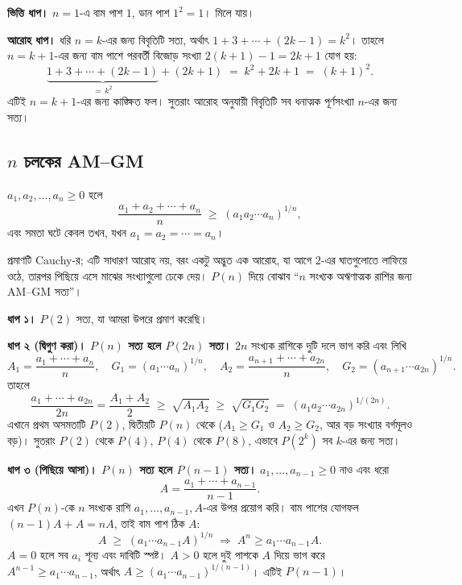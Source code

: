 \documentclass[11pt]{article}
\begin{document}
\begin{solbox}
\textbf{ভিত্তি ধাপ।} $n = 1$-এ বাম পাশ $1$, ডান পাশ $1^2 = 1$। মিলে যায়।

\textbf{আরোহ ধাপ।} ধরি $n = k$-এর জন্য বিবৃতিটি সত্য, অর্থাৎ
$1 + 3 + \cdots + (2k-1) = k^2$। তাহলে $n = k+1$-এর জন্য বাম পাশে পরবর্তী বিজোড়
সংখ্যা $2(k+1) - 1 = 2k+1$ যোগ হয়:
\[
  \underbrace{1 + 3 + \cdots + (2k-1)}_{= \, k^2} + (2k+1)
  \;=\; k^2 + 2k + 1 \;=\; (k+1)^2 .
\]
এটিই $n = k+1$-এর জন্য কাঙ্ক্ষিত ফল। সুতরাং আরোহ অনুযায়ী বিবৃতিটি সব ধনাত্মক
পূর্ণসংখ্যা $n$-এর জন্য সত্য।
\end{solbox}

\subsection{\texorpdfstring{$n$}{n} চলকের AM--GM}

\begin{idea}[AM--GM, সাধারণ রূপ]
$a_1, a_2, \dots, a_n \geq 0$ হলে
\[
  \frac{a_1 + a_2 + \cdots + a_n}{n}
  \;\geq\; \left( a_1 a_2 \cdots a_n \right)^{1/n} ,
\]
এবং সমতা ঘটে কেবল তখন, যখন $a_1 = a_2 = \cdots = a_n$।
\end{idea}

প্রমাণটি Cauchy-র; এটি সাধারণ আরোহ নয়, বরং একটু অদ্ভুত এক আরোহ, যা আগে $2$-এর
ঘাতগুলোতে লাফিয়ে ওঠে, তারপর পিছিয়ে এসে মাঝের সংখ্যাগুলো ঢেকে দেয়। $P(n)$
দিয়ে বোঝাব ``$n$ সংখ্যক অঋণাত্মক রাশির জন্য AM--GM সত্য''।

\textbf{ধাপ ১।} $P(2)$ সত্য, যা আমরা উপরে প্রমাণ করেছি।

\textbf{ধাপ ২ (দ্বিগুণ করা)। $P(n)$ সত্য হলে $P(2n)$ সত্য।} $2n$ সংখ্যক রাশিকে
দুটি দলে ভাগ করি এবং লিখি
\[
  A_1 = \frac{a_1 + \cdots + a_n}{n}, \quad
  G_1 = (a_1 \cdots a_n)^{1/n}, \quad
  A_2 = \frac{a_{n+1} + \cdots + a_{2n}}{n}, \quad
  G_2 = (a_{n+1} \cdots a_{2n})^{1/n} .
\]
তাহলে
\[
  \frac{a_1 + \cdots + a_{2n}}{2n} = \frac{A_1 + A_2}{2}
  \;\geq\; \sqrt{A_1 A_2}
  \;\geq\; \sqrt{G_1 G_2}
  \;=\; \left( a_1 a_2 \cdots a_{2n} \right)^{1/(2n)} .
\]
এখানে প্রথম অসমতাটি $P(2)$, দ্বিতীয়টি $P(n)$ থেকে ($A_1 \geq G_1$ ও
$A_2 \geq G_2$, আর বড় সংখ্যার বর্গমূলও বড়)। সুতরাং $P(2)$ থেকে $P(4)$, $P(4)$
থেকে $P(8)$, এভাবে $P(2^k)$ সব $k$-এর জন্য সত্য।

\textbf{ধাপ ৩ (পিছিয়ে আসা)। $P(n)$ সত্য হলে $P(n-1)$ সত্য।} $a_1, \dots,
a_{n-1} \geq 0$ নাও এবং ধরো
\[
  A = \frac{a_1 + \cdots + a_{n-1}}{n-1} .
\]
এখন $P(n)$-কে $n$ সংখ্যক রাশি $a_1, \dots, a_{n-1}, A$-এর উপর প্রয়োগ করি। বাম
পাশের যোগফল $(n-1)A + A = nA$, তাই বাম পাশ ঠিক $A$:
\[
  A \;\geq\; \left( a_1 \cdots a_{n-1} A \right)^{1/n}
  \;\Longrightarrow\; A^{n} \geq a_1 \cdots a_{n-1} A .
\]
$A = 0$ হলে সব $a_i$ শূন্য এবং দাবিটি স্পষ্ট। $A > 0$ হলে দুই পাশকে $A$ দিয়ে
ভাগ করে $A^{n-1} \geq a_1 \cdots a_{n-1}$, অর্থাৎ
$A \geq (a_1 \cdots a_{n-1})^{1/(n-1)}$। এটিই $P(n-1)$।
\end{document}
